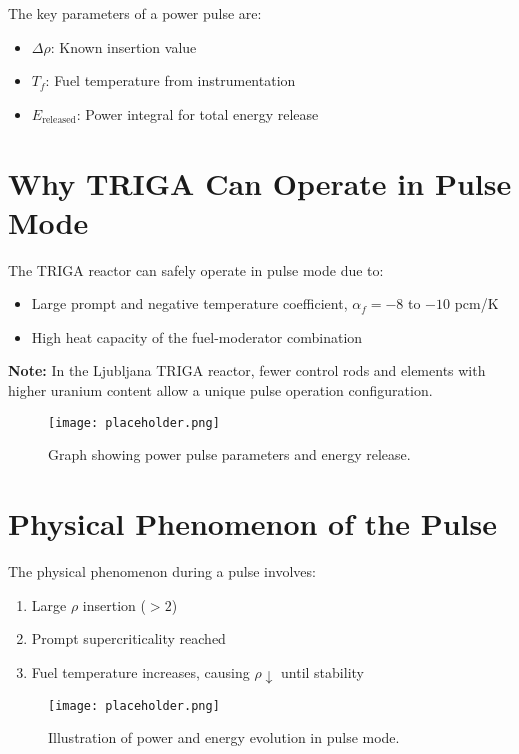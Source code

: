 The key parameters of a power pulse are:
\begin{itemize}
    \item $\Delta \rho$: Known insertion value
    \item $T_f$: Fuel temperature from instrumentation
    \item $E_{\text{released}}$: Power integral for total energy release
\end{itemize}

\section{Why TRIGA Can Operate in Pulse Mode}

The TRIGA reactor can safely operate in pulse mode due to:
\begin{itemize}
    \item Large prompt and negative temperature coefficient, $\alpha_f = -8$ to $-10$ pcm/K
    \item High heat capacity of the fuel-moderator combination
\end{itemize}

\begin{tcolorbox}[colback=white, colframe=cherenkovblue, boxrule=0.5mm, sharp corners]
\textbf{Note:} In the Ljubljana TRIGA reactor, fewer control rods and elements with higher uranium content allow a unique pulse operation configuration.
\end{tcolorbox}

\begin{figure}[h]
    \centering
        \texttt{[image: placeholder.png]}
    \caption{Graph showing power pulse parameters and energy release.}
\end{figure}

\section{Physical Phenomenon of the Pulse}

The physical phenomenon during a pulse involves:
\begin{enumerate}
    \item Large $\rho$ insertion ($>2$)
    \item Prompt supercriticality reached
    \item Fuel temperature increases, causing $\rho \downarrow$ until stability
\end{enumerate}

\begin{figure}[h]
    \centering
        \texttt{[image: placeholder.png]}
    \caption{Illustration of power and energy evolution in pulse mode.}
\end{figure}

